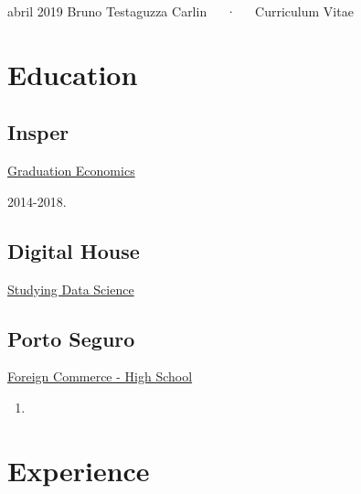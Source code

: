 \documentclass[11pt, a4paper]{awesome-cv}
\begin{document}
\makecvheader

\makecvfooter
  {abril 2019}
  {Bruno Testaguzza Carlin~~~·~~~Curriculum Vitae}
  {\thepage}





\hypertarget{education}{%
\section{Education}\label{education}}

\hypertarget{insper}{%
\subsection{Insper}\label{insper}}

\href{https://www.insper.edu.br/graduacao/economia/}{Graduation Economics}

2014-2018.

\hypertarget{digital-house}{%
\subsection{Digital House}\label{digital-house}}

\href{https://br.digitalhouse.com/curso/data-science/}{Studying Data Science}

\hypertarget{porto-seguro}{%
\subsection{Porto Seguro}\label{porto-seguro}}

\href{https://www.portoseguro.org.br/conteudo/detalhe/currculo-brasileiro/ensino-mdio-comrcio-exterior}{Foreign Commerce - High School}

\begin{enumerate}
\def\labelenumi{\arabic{enumi}.}
\setcounter{enumi}{2012}
\item
\end{enumerate}

\hypertarget{experience}{%
\section{Experience}\label{experience}}
\end{document}
